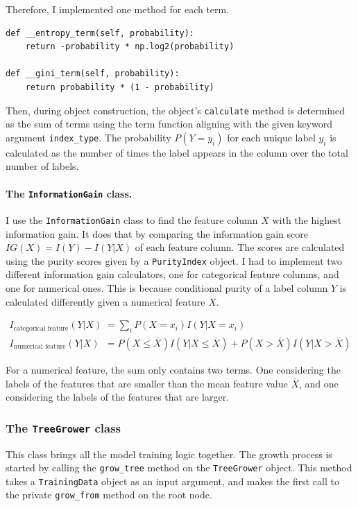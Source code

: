 \documentclass{article}
\begin{document}
Therefore, I implemented one method for each term.

\begin{verbatim}
def __entropy_term(self, probability):
    return -probability * np.log2(probability) 

def __gini_term(self, probability):
    return probability * (1 - probability)
\end{verbatim}

Then, during object construction, the object's \texttt{calculate} method is determined
as the sum of terms using the term function aligning with the given keyword argument 
\texttt{index\_type}. The probability $P(Y = y_i)$ for each unique label $y_i$ is calculated as
the number of times the label appears in the column over the total number of labels.

\paragraph{The \texttt{InformationGain} class.}
I use the \texttt{InformationGain} class to find the feature column $X$ with the highest information gain.
It does that by comparing the information gain score $IG(X) = I(Y) - I(Y | X)$ of each feature column.
The scores are calculated using the purity scores given by a \texttt{PurityIndex} object.
I had to implement two different information gain calculators, one for categorical feature columns,
and one for numerical ones.
This is because conditional purity of a label column $Y$ is calculated differently given a numerical feature $X$.

\begin{align*}
  I_{\text{categorical feature}} (Y|X) &= \sum_i P(X = x_i) I(Y|X = x_i)\\ 
  I_{\text{numerical feature}}(Y|X) &= P(X \leq \bar{X}) I(Y | X \leq \bar{X}) + P(X > \bar{X}) I(Y | X > \bar{X})   
\end{align*}

For a numerical feature, the sum only contains two terms.
One considering the labels of the features that are smaller than the mean feature value $\bar{X}$,
and one considering the labels of the features that are larger.

\subsubsection{The \texttt{TreeGrower} class}

This class brings all the model training logic together.
The growth process is started by calling the \texttt{grow\_tree} method on the \texttt{TreeGrower} object.
This method takes a \texttt{TrainingData} object as an input argument, and makes the first call to
the private \texttt{grow\_from} method on the root node.
\end{document}
